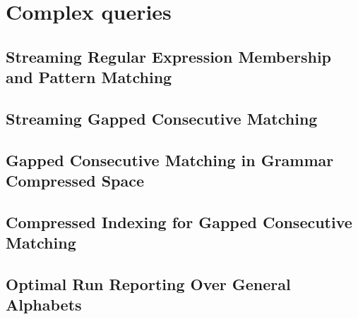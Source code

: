 \part{Complex queries}\label{part:complex_queries}

\mainmatter
\chapter{Streaming Regular Expression Membership and Pattern Matching}\label{chap:regexp}


\chapter{Streaming Gapped Consecutive Matching}\label{chap:gapped_stream}
\mainmatter
\chapter{Gapped Consecutive Matching in Grammar Compressed Space}\label{chap:gapped_pm}
\mainmatter
\chapter{Compressed Indexing for Gapped Consecutive Matching}\label{chap:gapped_index}

\mainmatter
\chapter{Optimal Run Reporting Over General Alphabets}\label{chap:squares}
